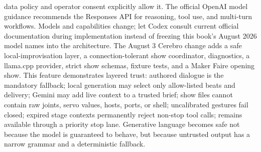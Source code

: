 {}data policy and operator consent explicitly allow it.\markdownRendererInterblockSeparator
{}\markdownRendererSectionBegin
{}\markdownRendererInterblockSeparator
{}\markdownRendererInterblockSeparator
{}The official OpenAI model guidance recommends the Responses API for reasoning,\markdownRendererSoftLineBreak
{}tool use, and multi-turn workflows. Models and capabilities change; let Codex\markdownRendererSoftLineBreak
{}consult current official documentation during implementation instead of\markdownRendererSoftLineBreak
{}freezing this book's August 2026 model names into the architecture.\markdownRendererInterblockSeparator
{}\markdownRendererThematicBreak{}\markdownRendererInterblockSeparator
{}
\markdownRendererSectionEnd 
\markdownRendererSectionEnd \markdownRendererSectionBegin
{}\markdownRendererInterblockSeparator
{}The August 3 Cerebro change adds a safe local-improvisation layer, a\markdownRendererSoftLineBreak
{}connection-tolerant show coordinator, diagnostics, a llama.cpp provider, strict\markdownRendererSoftLineBreak
{}show schemas, fixture tests, and a Maker Faire opening show.\markdownRendererParagraphSeparator
{}This feature demonstrates layered trust:\markdownRendererInterblockSeparator
{}\markdownRendererUlBegin
\markdownRendererUlItem authored dialogue is the mandatory fallback;\markdownRendererUlItemEnd 
\markdownRendererUlItem local generation may select only allow-listed beats and delivery;\markdownRendererUlItemEnd 
\markdownRendererUlItem Gemini may add live context to a trusted brief;\markdownRendererUlItemEnd 
\markdownRendererUlItem show files cannot contain raw joints, servo values, hosts, ports, or shell;\markdownRendererUlItemEnd 
\markdownRendererUlItem uncalibrated gestures fail closed;\markdownRendererUlItemEnd 
\markdownRendererUlItem expired stage contexts permanently reject non-stop tool calls;\markdownRendererUlItemEnd 
\markdownRendererUlItem {} remains available through a priority stop lane.\markdownRendererUlItemEnd 
\markdownRendererUlEnd \markdownRendererInterblockSeparator
{}Generative language becomes safe not because the model is guaranteed to behave,\markdownRendererSoftLineBreak
{}but because untrusted output has a narrow grammar and a deterministic fallback.\markdownRendererParagraphSeparator
